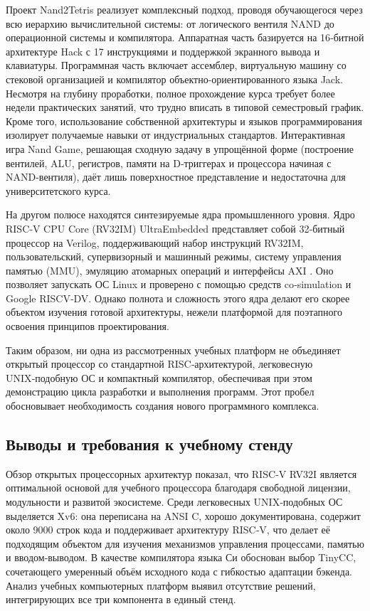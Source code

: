 Проект Nand2Tetris \cite{Nand2Tetris} реализует комплексный подход, проводя обучающегося через всю иерархию вычислительной системы: от логического вентиля NAND до операционной системы и компилятора. Аппаратная часть базируется на 16‑битной архитектуре Hack с 17 инструкциями и поддержкой экранного вывода и клавиатуры. Программная часть включает ассемблер, виртуальную машину со стековой организацией и компилятор объектно-ориентированного языка Jack. Несмотря на глубину проработки, полное прохождение курса требует более недели практических занятий, что трудно вписать в типовой семестровый график. Кроме того, использование собственной архитектуры и языков программирования изолирует получаемые навыки от индустриальных стандартов. Интерактивная игра Nand Game, решающая сходную задачу в упрощённой форме (построение вентилей, ALU, регистров, памяти на D‑триггерах и процессора начиная с NAND-вентиля), даёт лишь поверхностное представление и недостаточна для университетского курса.

На другом полюсе находятся синтезируемые ядра промышленного уровня. Ядро RISC‑V CPU Core (RV32IM) UltraEmbedded представляет собой 32‑битный процессор на Verilog, поддерживающий набор инструкций RV32IM, пользовательский, супервизорный и машинный режимы, систему управления памятью (MMU), эмуляцию атомарных операций и интерфейсы AXI \cite{UltraEmbedded}. Оно позволяет запускать ОС Linux и проверено с помощью средств co‑simulation и Google RISCV‑DV. Однако полнота и сложность этого ядра делают его скорее объектом изучения готовой архитектуры, нежели платформой для поэтапного освоения принципов проектирования.

Таким образом, ни одна из рассмотренных учебных платформ не объединяет открытый процессор со стандартной RISC‑архитектурой, легковесную UNIX‑подобную ОС и компактный компилятор, обеспечивая при этом демонстрацию цикла разработки и выполнения программ. Этот пробел обосновывает необходимость создания нового программного комплекса.

\subsection{Выводы и требования к учебному стенду}

Обзор открытых процессорных архитектур показал, что RISC‑V RV32I является оптимальной основой для учебного процессора благодаря свободной лицензии, модульности и развитой экосистеме. Среди легковесных UNIX‑подобных ОС выделяется Xv6: она переписана на ANSI C, хорошо документирована, содержит около 9000 строк кода и поддерживает архитектуру RISC‑V, что делает её подходящим объектом для изучения механизмов управления процессами, памятью и вводом‑выводом. В качестве компилятора языка Си обоснован выбор TinyCC, сочетающего умеренный объём исходного кода с гибкостью адаптации бэкенда. Анализ учебных компьютерных платформ выявил отсутствие решений, интегрирующих все три компонента в единый стенд.

